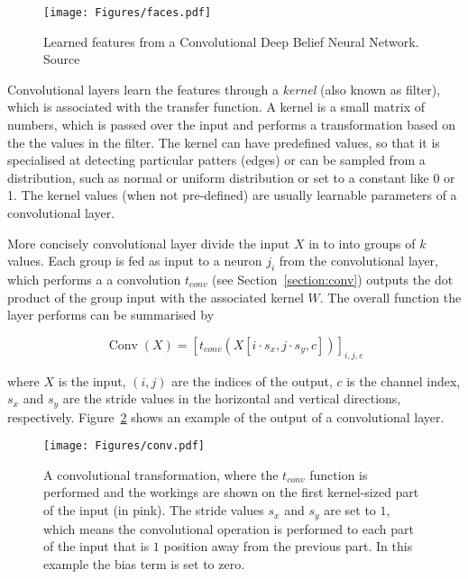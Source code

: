 \begin{figure}[ht!]
	\begin{center}
		\texttt{[image: Figures/faces.pdf]}
	\end{center}
	\caption{Learned features from a Convolutional Deep Belief Neural Network. Source~\cite{LeeGRN09}}
	\label{Fig:faces}
\end{figure} 

Convolutional layers learn the features through a \textit{kernel} (also known as filter), which is associated with the transfer function. A kernel is a small matrix of numbers, which is passed over the input and performs a transformation based on the the values in the filter. The kernel can have predefined values, so that it is specialised at detecting particular patters (\eg edges) or can be sampled from a distribution, such as normal or uniform distribution or set to a constant like 0 or 1. The kernel values (when not pre-defined) are usually learnable parameters of a convolutional layer.

More concisely convolutional layer divide the input $X$ in to into groups of $k$ values. Each group is fed as input to a neuron $j_i$ from the convolutional layer, which performs a a convolution  $t_{conv}$ (see Section~\ref{section:conv}) outputs the dot product of the group input with the associated kernel $W$. The overall function the layer performs can be summarised by 

\begin{equation}
\operatorname{Conv}(X)= [t_{conv}(X[i \cdot s_x, j \cdot s_y, c])]_{i,j,c}
\label{eq:conv_layer}
\end{equation}

where $X$ is the input, $(i,j)$ are the indices of the output, $c$ is the channel index, $s_x$ and $s_y$ are the stride values in the horizontal and vertical directions, respectively. Figure~\ref{Fig:conv} shows an example of the output of a convolutional layer.

\begin{figure}[ht!]
	\begin{center}
		\texttt{[image: Figures/conv.pdf]}
	\end{center}
	\caption{A convolutional transformation, where the $t_{conv}$ function is performed and the workings are shown on the first kernel-sized part of the input (in pink). The stride values $s_x$ and $s_y$ are set to $1$, which means the convolutional operation is performed to each part of the input that is $1$ position away from the previous part. In this example the bias term is set to zero.}
	\label{Fig:conv}
\end{figure} 

